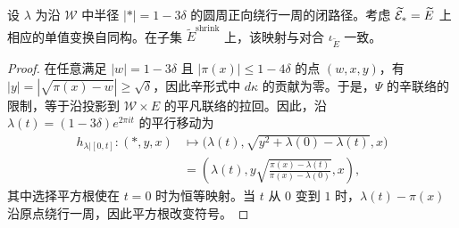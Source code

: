 \begin{lemma}\label{st:18.1}
设 $\lambda$ 为沿 $\mathcal W$ 中半径 $|*|=1-3\delta$ 的圆周正向绕行一周的闭路径。考虑 $\widetilde{\mathcal E}_*=\widetilde E$ 上相应的单值变换自同构。在子集 $\widetilde E^{\mathrm{shrink}}$ 上，该映射与对合 $\iota_{\widetilde E}$ 一致。
\end{lemma}
\begin{proof}
在任意满足 $|w|=1-3\delta$ 且 $|\pi(x)|\le1-4\delta$ 的点 $(w,x,y)$，有 $|y|=|\sqrt{\pi(x)-w}|\ge\sqrt\delta$，因此辛形式中 $d\kappa$ 的贡献为零。于是，$\Psi$ 的辛联络的限制，等于沿投影到 $\mathcal W\times E$ 的平凡联络的拉回。因此，沿
$\lambda(t)=(1-3\delta)e^{2\pi it}$ 的平行移动为
\begin{equation}\label{eq:18.12}
\begin{aligned}
h_{\lambda|[0,t]}:(*,y,x)&\longmapsto\bigl(\lambda(t),\sqrt{y^2+\lambda(0)-\lambda(t)},x\bigr)\\
&=\left(\lambda(t),y\sqrt{\frac{\pi(x)-\lambda(t)}{\pi(x)-\lambda(0)}},x\right),
\end{aligned}
\end{equation}
其中选择平方根使在 $t=0$ 时为恒等映射。当 $t$ 从 $0$ 变到 $1$ 时，$\lambda(t)-\pi(x)$ 沿原点绕行一周，因此平方根改变符号。
\end{proof}
